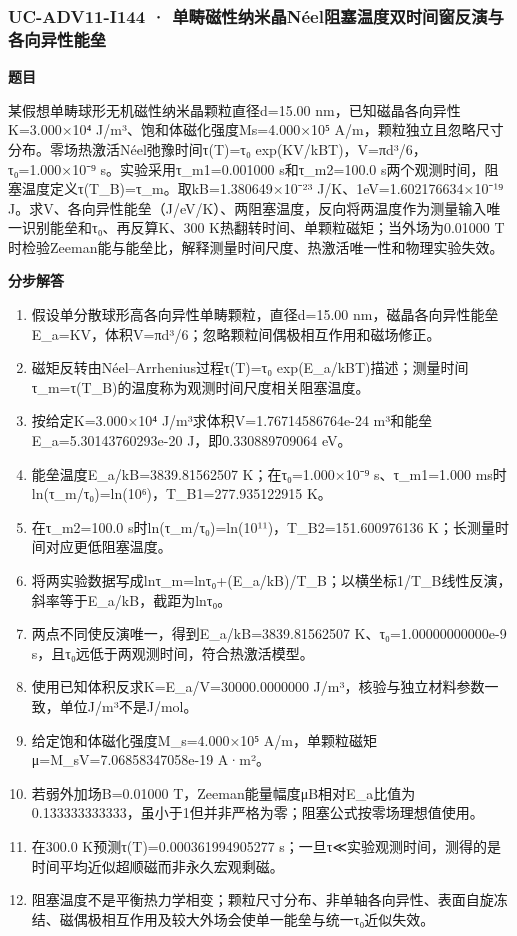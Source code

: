 \documentclass[UTF8,11pt,a4paper]{ctexart}
\begin{document}
\subsubsection*{UC-ADV11-I144 · 单畴磁性纳米晶Néel阻塞温度双时间窗反演与各向异性能垒}
\noindent\textbf{题目}\par
某假想单畴球形无机磁性纳米晶颗粒直径d=15.00 nm，已知磁晶各向异性K=3.000×10⁴ J/m³、饱和体磁化强度Ms=4.000×10⁵ A/m，颗粒独立且忽略尺寸分布。零场热激活Néel弛豫时间τ(T)=τ₀ exp(KV/kBT)，V=πd³/6，τ₀=1.000×10⁻⁹ s。实验采用τ\_m1=0.001000 s和τ\_m2=100.0 s两个观测时间，阻塞温度定义τ(T\_B)=τ\_m。取kB=1.380649×10⁻²³ J/K、1eV=1.602176634×10⁻¹⁹ J。求V、各向异性能垒（J/eV/K）、两阻塞温度，反向将两温度作为测量输入唯一识别能垒和τ₀、再反算K、300 K热翻转时间、单颗粒磁矩；当外场为0.01000 T时检验Zeeman能与能垒比，解释测量时间尺度、热激活唯一性和物理实验失效。\par
\medskip\noindent\textbf{分步解答}
\begin{enumerate}
\item 假设单分散球形高各向异性单畴颗粒，直径d=15.00 nm，磁晶各向异性能垒E\_a=KV，体积V=πd³/6；忽略颗粒间偶极相互作用和磁场修正。
\item 磁矩反转由Néel–Arrhenius过程τ(T)=τ₀ exp(E\_a/kBT)描述；测量时间τ\_m=τ(T\_B)的温度称为观测时间尺度相关阻塞温度。
\item 按给定K=3.000×10⁴ J/m³求体积V=1.76714586764e-24 m³和能垒E\_a=5.30143760293e-20 J，即0.330889709064 eV。
\item 能垒温度E\_a/kB=3839.81562507 K；在τ₀=1.000×10⁻⁹ s、τ\_m1=1.000 ms时ln(τ\_m/τ₀)=ln(10⁶)，T\_B1=277.935122915 K。
\item 在τ\_m2=100.0 s时ln(τ\_m/τ₀)=ln(10¹¹)，T\_B2=151.600976136 K；长测量时间对应更低阻塞温度。
\item 将两实验数据写成lnτ\_m=lnτ₀+(E\_a/kB)/T\_B；以横坐标1/T\_B线性反演，斜率等于E\_a/kB，截距为lnτ₀。
\item 两点不同使反演唯一，得到E\_a/kB=3839.81562507 K、τ₀=1.00000000000e-9 s，且τ₀远低于两观测时间，符合热激活模型。
\item 使用已知体积反求K=E\_a/V=30000.0000000 J/m³，核验与独立材料参数一致，单位J/m³不是J/mol。
\item 给定饱和体磁化强度M\_s=4.000×10⁵ A/m，单颗粒磁矩μ=M\_sV=7.06858347058e-19 A·m²。
\item 若弱外加场B=0.01000 T，Zeeman能量幅度μB相对E\_a比值为0.133333333333，虽小于1但并非严格为零；阻塞公式按零场理想值使用。
\item 在300.0 K预测τ(T)=0.000361994905277 s；一旦τ≪实验观测时间，测得的是时间平均近似超顺磁而非永久宏观剩磁。
\item 阻塞温度不是平衡热力学相变；颗粒尺寸分布、非单轴各向异性、表面自旋冻结、磁偶极相互作用及较大外场会使单一能垒与统一τ₀近似失效。
\end{enumerate}
\end{document}
